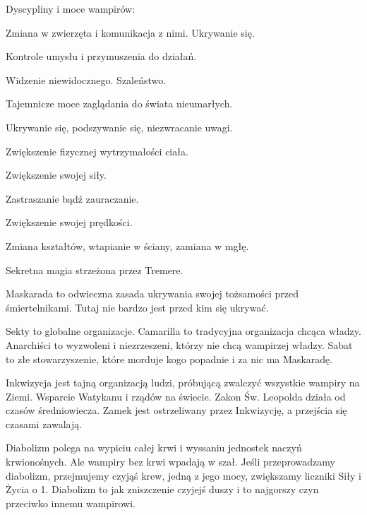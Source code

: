 			Dyscypliny i moce wampirów:
			\begin{description}[noitemsep]
				\item[Animalizm] Zmiana w zwierzęta i komunikacja z nimi. Ukrywanie się.
				\item[Dominacja] Kontrole umysłu i przymuszenia do działań.
				\item[Nadwrażliwość] Widzenie niewidocznego. Szaleństwo.
				\item[Nekromancja] Tajemnicze moce zaglądania do świata nieumarłych.
				\item[Niewidoczność] Ukrywanie się, podszywanie się, niezwracanie uwagi.
				\item[Odporność] Zwiększenie fizycznej wytrzymałości ciała.
				\item[Potencja] Zwiększenie swojej siły.
				\item[Prezencja] Zastraszanie bądź zauraczanie.
				\item[Przyspieszenie] Zwiększenie swojej prędkości.
				\item[Transformacja] Zmiana kształtów, wtapianie w ściany, zamiana w mgłę.
				\item[Magia Krwi] Sekretna magia strzeżona przez Tremere.
			\end{description}
			
			Maskarada to odwieczna zasada ukrywania swojej tożsamości przed śmiertelnikami.
			Tutaj nie bardzo jest przed kim się ukrywać.
			
			Sekty to globalne organizacje. Camarilla to tradycyjna organizacja chcąca władzy. Anarchiści to wyzwoleni i niezrzeszeni, którzy nie chcą wampirzej władzy. Sabat to złe stowarzyszenie, które morduje kogo popadnie i za nic ma Maskaradę.

			Inkwizycja jest tajną organizacją ludzi, próbującą zwalczyć wszystkie wampiry na Ziemi.
			Wsparcie Watykanu i rządów na świecie.
			Zakon Św. Leopolda działa od czasów średniowiecza.
			Zamek jest ostrzeliwany przez Inkwizycję, a przejścia się czasami zawalają.
			
			Diabolizm polega na wypiciu całej krwi i wyssaniu jednostek naczyń krwionośnych.
			Ale wampiry bez krwi wpadają w szał.
			Jeśli przeprowadzamy diabolizm, przejmujemy czyjąś krew, jedną z jego mocy, zwiększamy liczniki Siły i Życia o 1.
			Diabolizm to jak zniszczenie czyjejś duszy i to najgorszy czyn przeciwko innemu wampirowi.
			
